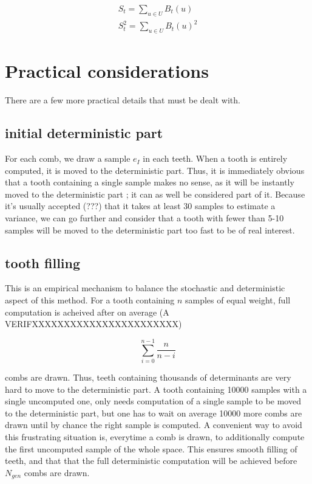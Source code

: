 \documentclass[./thesis.tex]{subfiles}
\begin{document}
\begin{align}
 S_t = \sum_{u \in {U}} B_t(u) \\
 S^2_t = \sum_{u \in {U}} B_t(u)^2
\end{align}


\section{Practical considerations}

There are a few more practical details that must be dealt with.

\subsection*{initial deterministic part}

For each comb, we draw a sample $e_I$ in each teeth. When a tooth is entirely computed, it is moved to the deterministic part. Thus, it is immediately obvious that a tooth containing a single sample makes no sense, as it will be instantly moved to the deterministic part ; it can as well be considered part of it. Because it's usually accepted (???) that it takes at least 30 samples to estimate a variance, we can go further and consider that a tooth with fewer than 5-10 samples will be moved to the deterministic part too fast to be of real interest.


\subsection*{tooth filling}

This is an empirical mechanism to balance the stochastic and deterministic aspect of this method. For a tooth containing $n$ samples of equal weight, full computation is acheived after on average (A VERIFXXXXXXXXXXXXXXXXXXXXXXX)

\begin{equation}
\sum_{i=0}^{n-1} \frac{n}{n-i}
\end{equation}

combs are drawn. Thus, teeth containing thousands of determinants are very hard to move to the deterministic part. A tooth containing 10000 samples with a single uncomputed one, only needs computation of a single sample to be moved to the deterministic part, but one has to wait on average 10000 more combs are drawn until by chance the right sample is computed.
A convenient way to avoid this frustrating situation is, everytime a comb is drawn, to additionally compute the first uncomputed sample of the whole space. This ensures smooth filling of teeth, and that that the full deterministic computation will be achieved before $N_{gen}$ combs are drawn.
\end{document}
